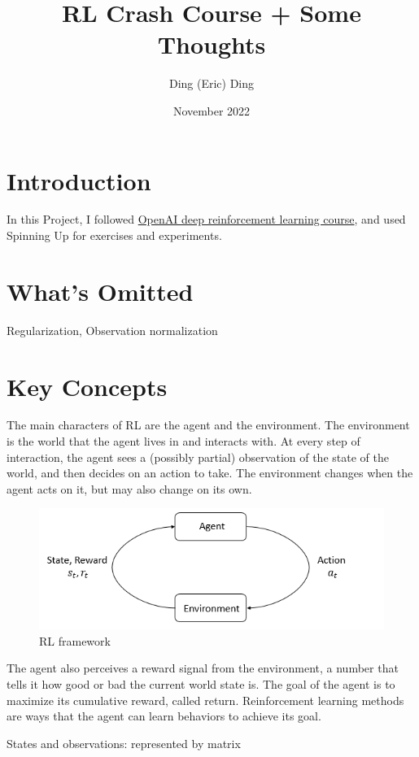 \documentclass{article}
\title{RL Crash Course + Some Thoughts}
\author{Ding (Eric) Ding}
\date{November 2022}
\begin{document}
\maketitle

\section{Introduction}
    In this Project, I followed \href{https://spinningup.openai.com/en/latest/index.html}{OpenAI deep reinforcement learning course}, and used Spinning Up for exercises and experiments.
    

\section{What's Omitted}
    Regularization, Observation normalization

\section{Key Concepts}
    The main characters of RL are the agent and the environment. The environment is the world that the agent lives in and interacts with. At every step of interaction, the agent sees a (possibly partial) observation of the state of the world, and then decides on an action to take. The environment changes when the agent acts on it, but may also change on its own.
    \begin{figure}[H]
        \includegraphics[width=\linewidth]{rl_diagram_transparent_bg.png}
        \caption{RL framework}
        \label{fig:rl}
      \end{figure}

    The agent also perceives a reward signal from the environment, a number that tells it how good or bad the current world state is. The goal of the agent is to maximize its cumulative reward, called return. Reinforcement learning methods are ways that the agent can learn behaviors to achieve its goal.

    States and observations: represented by matrix
\end{document}
